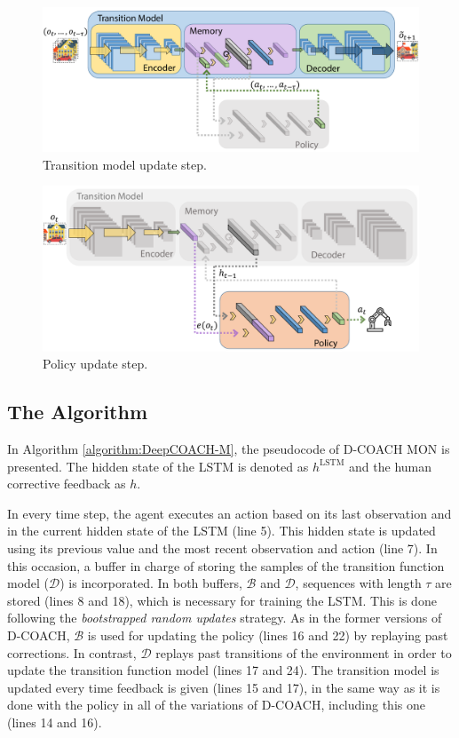\begin{figure}[h]
    \centering
    \includegraphics[width=0.93\linewidth]{imagenes/cap4/hd_mon1.pdf}
    \caption{Transition model update step.}
    \label{fig:hd_mon_train1}
\end{figure}

\begin{figure}[h]
    \centering
    \includegraphics[width=0.93\linewidth]{imagenes/cap4/hd_mon2.pdf}
    \caption{Policy update step.}
    \label{fig:hd_mon_train2}
\end{figure}


\subsection{The Algorithm}

In Algorithm \ref{algorithm:DeepCOACH-M}, the pseudocode of D-COACH MON is presented. The hidden state of the LSTM is denoted as  $h^{\mathrm{LSTM}}$ and the human corrective feedback as $h$.

In every time step, the agent executes an action based on its last observation and in the current hidden state of the LSTM (line 5). This hidden state is updated using its previous value and the most recent observation and action (line 7). In this occasion, a buffer in charge of storing the samples of the transition function model ($\mathcal{D}$) is incorporated. In both buffers, $\mathcal{B}$ and $\mathcal{D}$, sequences with length $\tau$ are stored (lines 8 and 18), which is necessary for training the LSTM. This is done following the \emph{bootstrapped random updates} \cite{hausknecht2015deep} strategy. As in the former versions of D-COACH, $\mathcal{B}$ is used for updating the policy (lines 16 and 22) by replaying past corrections. In contrast, $\mathcal{D}$ replays past transitions of the environment in order to update the transition function model (lines 17 and 24). The transition model is updated every time feedback is given (lines 15 and 17), in the same way as it is done with the policy in all of the variations of D-COACH, including this one (lines 14 and 16). 

